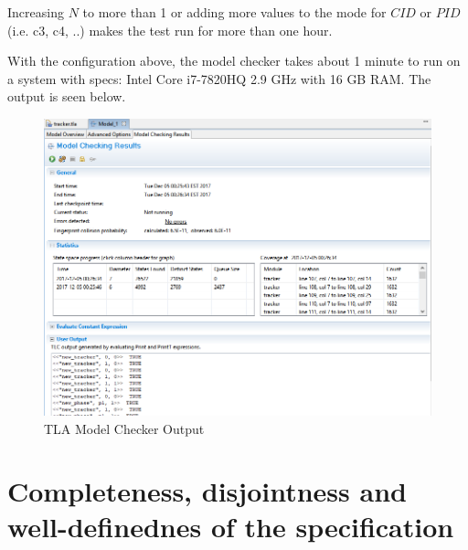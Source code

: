 Increasing $N$ to more than 1 or adding more values to the mode for $CID$ or $PID$ (i.e. c3, c4, ..) makes the test run for more than one hour. 

\newpage

With the configuration above, the model checker takes about 1 minute to run on a system with specs: Intel Core i7-7820HQ 2.9 GHz with 16 GB RAM. The output is seen below.
\begin{figure}[!htb]
\begin{center}
\includegraphics[width=.99\textwidth]{images/tlc_output.png}
\end{center}
\caption{TLA Model Checker Output}
\label{fig:model_config_output}
\end{figure}

\newpage
\newpage
\section{Completeness, disjointness and well-definednes of the specification}

